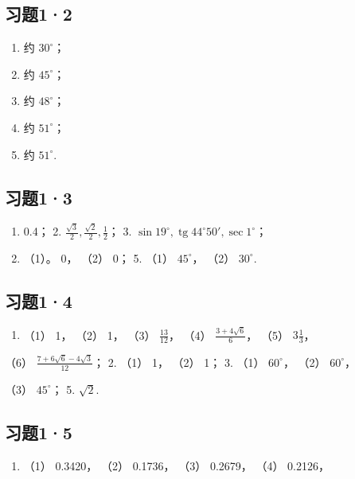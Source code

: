 \subsection{习题1·2}

\begin{enumerate}
\item
  约 \(30^{\circ}\)；
\item
  约 \(45^{\circ}\)；
\item
  约 \(48^{\circ}\)；
\item
  约 \(51^{\circ}\)；
\item
  约 \(51^{\circ}\).
\end{enumerate}

\subsection{习题1·3}

\begin{enumerate}
\item
  0.4； 2. \(\frac{\sqrt{3}}{2}, \frac{\sqrt{2}}{2}, \frac{1}{2}\)； 3.
  \(\sin 19^{\circ}, \operatorname{tg} 44^{\circ}50', \sec 1^{\circ}\)；
\item
  （1）。 0， （2） 0； 5. （1） \(45^{\circ}\)， （2） \(30^{\circ}\).
\end{enumerate}

\subsection{习题1·4}

\begin{enumerate}
\item
  （1） 1， （2） 1， （3） \(\frac{13}{12}\)， （4）
  \(\frac{3 + 4\sqrt{6}}{6}\)， （5） \(3\frac{1}{3}\)，
\end{enumerate}

（6） \(\frac{7 + 6\sqrt{6} - 4\sqrt{3}}{12}\)； 2. （1） 1， （2） 1；
3. （1） \(60^{\circ}\)， （2） \(60^{\circ}\)，

（3） \(45^{\circ}\)； 5. \(\sqrt{2}\).

\subsection{习题1·5}

\begin{enumerate}
\item
  （1） 0.3420， （2） 0.1736， （3） 0.2679， （4） 0.2126，
\end{enumerate}

